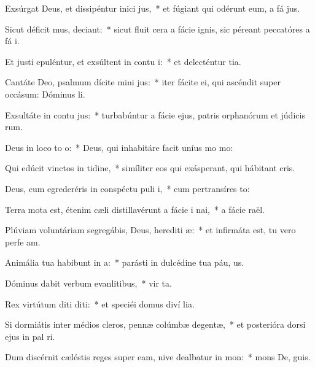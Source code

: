 \item Exsúrgat Deus, et dissipéntur inici jus,~* et fúgiant qui odérunt eum, a fá jus.
\item Sicut déficit mus, deciant:~* sicut fluit cera a fácie ignis, sic péreant peccatóres a fá i.
\item Et justi epuléntur, et exsúltent in contu i:~* et delecténtur  tia.
\item Cantáte Deo, psalmum dícite mini jus:~* iter fácite ei, qui ascéndit super occásum: Dóminus  li.
\item Exsultáte in contu jus:~* turbabúntur a fácie ejus, patris orphanórum et júdicis rum.
\item Deus in loco to o:~* Deus, qui inhabitáre facit uníus mo  mo:
\item Qui edúcit vinctos in tidine,~* simíliter eos qui exásperant, qui hábitant  cris.
\item Deus, cum egrederéris in conspéctu puli i,~* cum pertransíres  to:
\item Terra mota est, étenim cæli distillavérunt a fácie i nai,~* a fácie  raël.
\item Plúviam voluntáriam segregábis, Deus, herediti æ:~* et infirmáta est, tu vero perfe am.
\item Animália tua habibunt in a:~* parásti in dulcédine tua páu, us.
\item Dóminus dabit verbum evanlitibus,~* vir ta.
\item Rex virtútum diti diti:~* et speciéi domus diví lia.
\item Si dormiátis inter médios cleros, pennæ colúmbæ degentæ,~* et posterióra dorsi ejus in pal ri.
\item Dum discérnit cæléstis reges super eam, nive dealbatur in mon:~* mons De,  guis.

